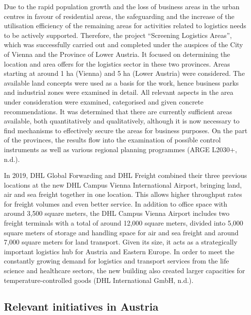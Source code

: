 \documentclass[
]{book}
\begin{document}
Due to the rapid population growth and the loss of business areas in the urban centres in favour of residential areas, the safeguarding and the increase of the utilisation efficiency of the remaining areas for activities related to logistics needs to be actively supported. Therefore, the project ``Screening Logistics Areas'', which was successfully carried out and completed under the auspices of the City of Vienna and the Province of Lower Austria. It focused on determining the location and area offers for the logistics sector in these two provinces. Areas starting at around 1 ha (Vienna) and 5 ha (Lower Austria) were considered. The available land concepts were used as a basis for the work, hence business parks and industrial zones were examined in detail. All relevant aspects in the area under consideration were examined, categorised and given concrete recommendations. It was determined that there are currently sufficient areas available, both quantitatively and qualitatively, although it is now necessary to find mechanisms to effectively secure the areas for business purposes. On the part of the provinces, the results flow into the examination of possible control instruments as well as various regional planning programmes (ARGE L2030+, n.d.).

In 2019, DHL Global Forwarding and DHL Freight combined their three previous locations at the new DHL Campus Vienna International Airport, bringing land, air and sea freight together in one location. This allows higher throughput rates for freight volumes and even better service. In addition to office space with around 3,500 square meters, the DHL Campus Vienna Airport includes two freight terminals with a total of around 12,000 square meters, divided into 5,000 square meters of storage and handling space for air and sea freight and around 7,000 square meters for land transport. Given its size, it acts as a strategically important logistics hub for Austria and Eastern Europe. In order to meet the constantly growing demand for logistics and transport services from the life science and healthcare sectors, the new building also created larger capacities for temperature-controlled goods (DHL International GmbH, n.d.).

\hypertarget{relevant-initiatives-in-austria-35}{%
\subsection*{Relevant initiatives in Austria}\label{relevant-initiatives-in-austria-35}}
\end{document}
